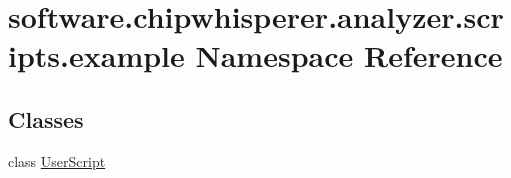 \hypertarget{namespacesoftware_1_1chipwhisperer_1_1analyzer_1_1scripts_1_1example}{}\section{software.\+chipwhisperer.\+analyzer.\+scripts.\+example Namespace Reference}
\label{namespacesoftware_1_1chipwhisperer_1_1analyzer_1_1scripts_1_1example}
\subsection*{Classes}
\begin{DoxyCompactItemize}
\item 
class \hyperlink{classsoftware_1_1chipwhisperer_1_1analyzer_1_1scripts_1_1example_1_1UserScript}{User\+Script}
\end{DoxyCompactItemize}
